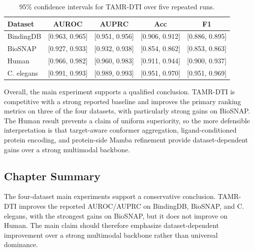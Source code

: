 \begin{table}[!htbp]
\caption{95\% confidence intervals for TAMR-DTI over five repeated runs.}
\label{tab:main_ci}
\begin{center}
\scriptsize
\setlength{\tabcolsep}{4pt}
\begin{tabular}{lcccc}
\toprule
Dataset & AUROC & AUPRC & Acc & F1 \\
\midrule
BindingDB & [0.963, 0.965] & [0.951, 0.956] & [0.906, 0.912] & [0.886, 0.895] \\
BioSNAP & [0.927, 0.933] & [0.932, 0.938] & [0.854, 0.862] & [0.853, 0.863] \\
Human & [0.966, 0.982] & [0.960, 0.983] & [0.911, 0.944] & [0.900, 0.937] \\
C. elegans & [0.991, 0.993] & [0.989, 0.993] & [0.951, 0.970] & [0.951, 0.969] \\
\bottomrule
\end{tabular}
\end{center}
\end{table}

Overall, the main experiment supports a qualified conclusion. TAMR-DTI is competitive with a strong reported baseline and improves the primary ranking metrics on three of the four datasets, with particularly strong gains on BioSNAP. The Human result prevents a claim of uniform superiority, so the more defensible interpretation is that target-aware conformer aggregation, ligand-conditioned protein encoding, and protein-side Mamba refinement provide dataset-dependent gains over a strong multimodal backbone.

\FloatBarrier
\subsection{Chapter Summary}

The four-dataset main experiments support a conservative conclusion. TAMR-DTI improves the reported AUROC/AUPRC on BindingDB, BioSNAP, and C. elegans, with the strongest gains on BioSNAP, but it does not improve on Human. The main claim should therefore emphasize dataset-dependent improvement over a strong multimodal backbone rather than universal dominance.
